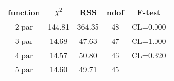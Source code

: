 \begin{tabular}{c|c|c|c|c}
function & $\chi^2$ & RSS & ndof & F-test \\
\hline
2 par & 144.81 & 364.35 & 48 & CL=0.000 \\
3 par & 14.68 & 47.63 & 47 & CL=1.000 \\
4 par & 14.57 & 50.80 & 46 & CL=0.320 \\
5 par & 14.60 & 49.71 & 45 & \\
\hline
\end{tabular}